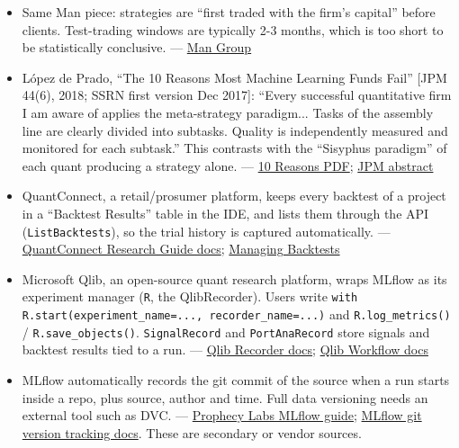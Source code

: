 \documentclass{article}
\begin{document}
\begin{itemize}
\item Same Man piece: strategies are ``first traded with the firm's capital'' before clients. Test-trading windows are typically 2-3 months, which is too short to be statistically conclusive. --- \href{https://www.man.com/insights/overfitting-and-its-impact-on-the-investor}{Man Group}

\item López de Prado, ``The 10 Reasons Most Machine Learning Funds Fail'' [JPM 44(6), 2018; SSRN first version Dec 2017]: ``Every successful quantitative firm I am aware of applies the meta-strategy paradigm... Tasks of the assembly line are clearly divided into subtasks. Quality is independently measured and monitored for each subtask.'' This contrasts with the ``Sisyphus paradigm'' of each quant producing a strategy alone. --- \href{https://www.smallake.kr/wp-content/uploads/2018/07/SSRN-id3104816.pdf}{10 Reasons PDF}; \href{https://jpm.pm-research.com/content/44/6/120.abstract}{JPM abstract}

\item QuantConnect, a retail/\allowbreak{}prosumer platform, keeps every backtest of a project in a ``Backtest Results'' table in the IDE, and lists them through the API (\texttt{ListBacktests}), so the trial history is captured automatically. --- \href{https://www.quantconnect.com/docs/v2/cloud-platform/backtesting/research-guide}{QuantConnect Research Guide docs}; \href{https://www.quantconnect.com/docs/v2/research-environment/tutorials/quantconnect-api/backtests/managing-backtests}{Managing Backtests}

\item Microsoft Qlib, an open-source quant research platform, wraps MLflow as its experiment manager (\texttt{R}, the QlibRecorder). Users write \texttt{with R.\allowbreak{}start(experiment\_\allowbreak{}name=.\allowbreak{}.\allowbreak{}.\allowbreak{},\allowbreak{} recorder\_\allowbreak{}name=.\allowbreak{}.\allowbreak{}.\allowbreak{})} and \texttt{R.\allowbreak{}log\_\allowbreak{}metrics()} /\allowbreak{} \texttt{R.\allowbreak{}save\_\allowbreak{}objects()}. \texttt{SignalRecord} and \texttt{PortAnaRecord} store signals and backtest results tied to a run. --- \href{https://qlib.readthedocs.io/en/latest/component/recorder.html}{Qlib Recorder docs}; \href{https://qlib.readthedocs.io/en/stable/component/workflow.html}{Qlib Workflow docs}

\item MLflow automatically records the git commit of the source when a run starts inside a repo, plus source, author and time. Full data versioning needs an external tool such as DVC. --- \href{https://www.prophecylabs.com/blog/a-swift-guide-to-experiment-tracking-with-mlflow}{Prophecy Labs MLflow guide}; \href{https://mlflow.org/docs/latest/genai/version-tracking/track-application-versions-with-mlflow/}{MLflow git version tracking docs}. These are secondary or vendor sources.


\end{itemize}
\end{document}
